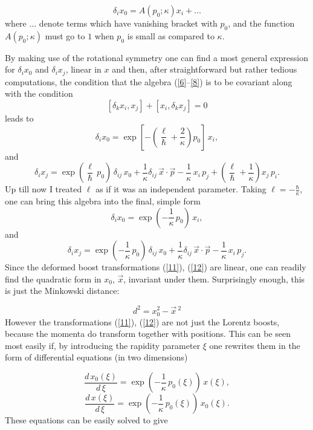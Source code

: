 \documentclass[a4paper,a4paper]{article}
\begin{document}
\begin{equation}\label{10}
  \delta_i x_0 = A(p_0;\kappa) x_i + \ldots
\end{equation}
where $\ldots$ denote terms which have vanishing bracket with $p_0$, and the function $A(p_0;\kappa)$ must go to $1$ when $p_0$ is small as compared to $\kappa$. 

By making use of the rotational symmetry one can find a most general expression for $\delta_i x_0 $ and $\delta_i x_j $, linear in $x$ and then, after straightforward but rather tedious computations, the condition that the algebra (\ref{6}--\ref{8}) is to be covariant  along with the condition
$$[\delta_k x_i, x_j] + [ x_i, \delta_k x_j]=0
$$
leads to 
$$
\delta_i x_0 = \exp\left[-\left(\frac\ell\hbar + \frac2\kappa \right)p_0 \right] \,  x_i  , 
$$
and
$$
 \delta_i x_j = \exp\left(\frac\ell\hbar\, p_0 \right)\, \delta_{ij}\, x_0  + \frac1\kappa \delta_{ij}\,\vec{x}\cdot \vec{p} - \frac1\kappa\, x_i \, p_j + \left(\frac\ell\hbar+ \frac1\kappa\right) x_j\, p_i. 
$$
Up till now I treated $\ell$ as if it was an independent parameter. Taking  $\ell   = -\frac\hbar\kappa$, one can bring this algebra into the final, simple form
\begin{equation}\label{11}
\delta_i x_0 = \exp\left(- \frac1\kappa \,p_0 \right) \,  x_i  , 
\end{equation}
and
\begin{equation}\label{12}
 \delta_i x_j = \exp\left(- \frac1\kappa \,p_0 \right)\, \delta_{ij}\, x_0  + \frac1\kappa \delta_{ij}\,\vec{x}\cdot \vec{p} - \frac1\kappa\, x_i \, p_j . 
\end{equation}
Since the deformed boost transformations (\ref{11}), (\ref{12}) are linear, one can readily find the quadratic form in $x_0$, $\vec{x}$, invariant under them. Surprisingly enough, this  is just the Minkowski distance:

\begin{equation}\label{13}
 d^2= x_0^2 - \vec{x} \,{}^2
\end{equation}
However the transformations (\ref{11}), (\ref{12}) are not just the Lorentz boosts, because the momenta  do transform together with positions. This can be seen most easily if,   by introducing the rapidity parameter $\xi$ one rewrites them in the form of differential equations (in two dimensions) 

\begin{equation}\label{14}
 \frac{d\,x_0(\xi)}{d\,\xi} = \exp\left(- \frac1\kappa \,p_0(\xi) \right) \,  x(\xi),
\end{equation}
\begin{equation}\label{15}
 \frac{d\,x(\xi)}{d\,\xi} = \exp\left(- \frac1\kappa \,p_0(\xi) \right) \,  x_0(\xi).
\end{equation}
These equations can be easily solved to give
\end{document}
